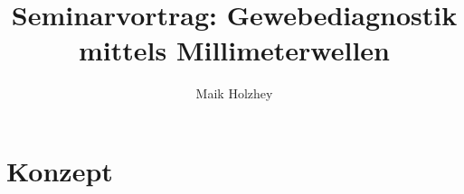 \documentclass{article}
\title{Seminarvortrag: Gewebediagnostik mittels Millimeterwellen}
\author{Maik Holzhey}
\begin{document}
\maketitle
\section{Konzept}
\begin{multicols}{2}
\lipsum
\cite{redmond_heneghan}
\lipsum
\end{multicols}


\end{document}
